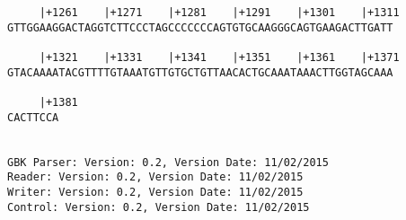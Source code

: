 \documentclass{article}
\begin{document}
\begin{Verbatim}
     |+1261    |+1271    |+1281    |+1291    |+1301    |+1311
GTTGGAAGGACTAGGTCTTCCCTAGCCCCCCCAGTGTGCAAGGGCAGTGAAGACTTGATT
                                                            
     |+1321    |+1331    |+1341    |+1351    |+1361    |+1371
GTACAAAATACGTTTTGTAAATGTTGTGCTGTTAACACTGCAAATAAACTTGGTAGCAAA
                                                            
     |+1381
CACTTCCA

        
GBK Parser: Version: 0.2, Version Date: 11/02/2015
Reader: Version: 0.2, Version Date: 11/02/2015
Writer: Version: 0.2, Version Date: 11/02/2015
Control: Version: 0.2, Version Date: 11/02/2015
\end{Verbatim}
\end{document}

